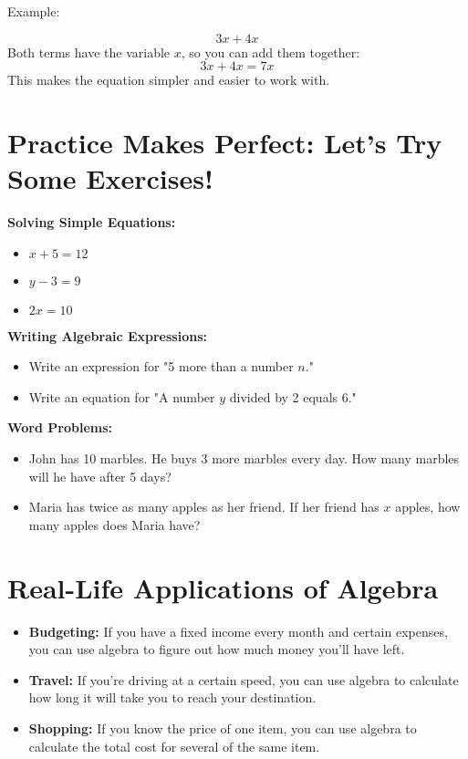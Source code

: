 Example:

\[ 3x + 4x \]
Both terms have the variable $x$, so you can add them together:
\[ 3x + 4x = 7x \]
This makes the equation simpler and easier to work with.

\section{Practice Makes Perfect: Let’s Try Some Exercises!}
\textbf{Solving Simple Equations:}
\begin{itemize}
    \item $x + 5 = 12$
    \item $y - 3 = 9$
    \item $2x = 10$
\end{itemize}

\textbf{Writing Algebraic Expressions:}
\begin{itemize}
    \item Write an expression for "5 more than a number $n$."
    \item Write an equation for "A number $y$ divided by 2 equals 6."
\end{itemize}

\textbf{Word Problems:}
\begin{itemize}
    \item John has 10 marbles. He buys 3 more marbles every day. How many marbles will he have after 5 days?
    \item Maria has twice as many apples as her friend. If her friend has $x$ apples, how many apples does Maria have?
\end{itemize}

\section{Real-Life Applications of Algebra}
\begin{itemize}
    \item \textbf{Budgeting:} If you have a fixed income every month and certain expenses, you can use algebra to figure out how much money you'll have left.
    \item \textbf{Travel:} If you’re driving at a certain speed, you can use algebra to calculate how long it will take you to reach your destination.
    \item \textbf{Shopping:} If you know the price of one item, you can use algebra to calculate the total cost for several of the same item.
\end{itemize}

